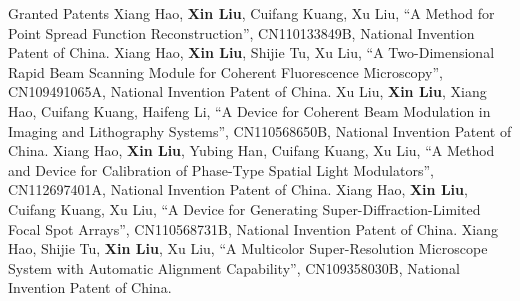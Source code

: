 \newcommand{\xin}{\textbf{Xin Liu}}
\begin{rubric}{Granted Patents}
	\entry*%
    Xiang Hao, \xin, Cuifang Kuang, Xu Liu, ``A Method for Point Spread Function Reconstruction'', CN110133849B, National Invention Patent of China.
    \entry*%
    Xiang Hao, \xin, Shijie Tu, Xu Liu, ``A Two-Dimensional Rapid Beam Scanning Module for Coherent Fluorescence Microscopy'', CN109491065A, National Invention Patent of China.
    \entry*%
    Xu Liu, \xin, Xiang Hao, Cuifang Kuang, Haifeng Li, ``A Device for Coherent Beam Modulation in Imaging and Lithography Systems'', CN110568650B, National Invention Patent of China.
    \entry*%
    Xiang Hao, \xin, Yubing Han, Cuifang Kuang, Xu Liu, ``A Method and Device for Calibration of Phase-Type Spatial Light Modulators'', CN112697401A, National Invention Patent of China.
    \entry*%
    Xiang Hao, \xin, Cuifang Kuang, Xu Liu, ``A Device for Generating Super-Diffraction-Limited Focal Spot Arrays'', CN110568731B, National Invention Patent of China.
    \entry*%
    Xiang Hao, Shijie Tu, \xin, Xu Liu, ``A Multicolor Super-Resolution Microscope System with Automatic Alignment Capability'', CN109358030B, National Invention Patent of China.
\end{rubric}